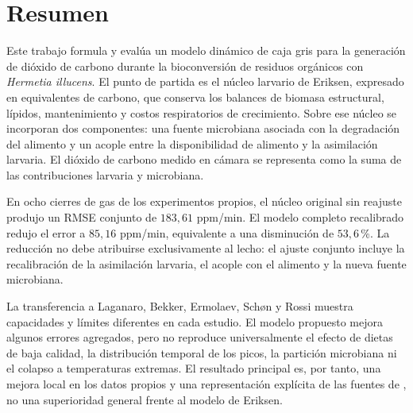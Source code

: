 \section*{Resumen}

Este trabajo formula y evalúa un modelo dinámico de caja gris para la
generación de dióxido de carbono durante la bioconversión de residuos
orgánicos con \textit{Hermetia illucens}. El punto de partida es el
núcleo larvario de Eriksen, expresado en equivalentes de carbono, que
conserva los balances de biomasa estructural, lípidos, mantenimiento y
costos respiratorios de crecimiento. Sobre ese núcleo se incorporan dos
componentes: una fuente microbiana asociada con la degradación del
alimento y un acople entre la disponibilidad de alimento y la
asimilación larvaria. El dióxido de carbono medido en cámara se
representa como la suma de las contribuciones larvaria y microbiana.

En ocho cierres de gas de los experimentos propios, el núcleo original
sin reajuste produjo un RMSE conjunto de $183{,}61$ ppm/min. El modelo
completo recalibrado redujo el error a $85{,}16$ ppm/min, equivalente a
una disminución de $53{,}6$\,\%. La reducción no debe atribuirse
exclusivamente al lecho: el ajuste conjunto incluye la recalibración de
la asimilación larvaria, el acople con el alimento y la nueva fuente
microbiana.

La transferencia a Laganaro, Bekker, Ermolaev, Schøn y Rossi muestra
capacidades y límites diferentes en cada estudio. El modelo propuesto
mejora algunos errores agregados, pero no reproduce universalmente el
efecto de dietas de baja calidad, la distribución temporal de los picos,
la partición microbiana ni el colapso a temperaturas extremas. El
resultado principal es, por tanto, una mejora local en los datos propios
y una representación explícita de las fuentes de \co{}, no una
superioridad general frente al modelo de Eriksen.
